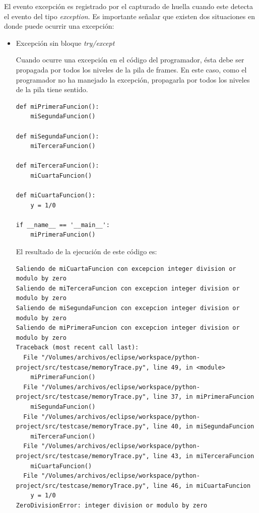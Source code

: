 \documentclass[12pt,legalpaper]{report}
\begin{document}
El evento excepción es registrado por el capturado de huella cuando este detecta el evento del tipo \textit{exception}.  Es importante señalar que existen dos situaciones en donde puede ocurrir una excepción:

\begin{itemize}
	\item Excepción sin bloque \textit{try/except}

Cuando ocurre una excepción en el código del programador, ésta debe ser propagada por todos los niveles de la pila de frames.  En este caso, como el programador no ha manejado la excepción, propagarla por todos los niveles de la pila tiene sentido.

\begin{singlespace}
\begin{lstlisting}[style=Python]
def miPrimeraFuncion():
    miSegundaFuncion()
    
def miSegundaFuncion():
    miTerceraFuncion()

def miTerceraFuncion():
    miCuartaFuncion()

def miCuartaFuncion():
    y = 1/0

if __name__ == '__main__':
    miPrimeraFuncion()
\end{lstlisting}
\end{singlespace}

El resultado de la ejecución de este código es:

\begin{singlespace}
\begin{lstlisting}[style=consola,numbers=none]
Saliendo de miCuartaFuncion con excepcion integer division or modulo by zero
Saliendo de miTerceraFuncion con excepcion integer division or modulo by zero
Saliendo de miSegundaFuncion con excepcion integer division or modulo by zero
Saliendo de miPrimeraFuncion con excepcion integer division or modulo by zero
Traceback (most recent call last):
  File "/Volumes/archivos/eclipse/workspace/python-project/src/testcase/memoryTrace.py", line 49, in <module>
    miPrimeraFuncion()
  File "/Volumes/archivos/eclipse/workspace/python-project/src/testcase/memoryTrace.py", line 37, in miPrimeraFuncion
    miSegundaFuncion()
  File "/Volumes/archivos/eclipse/workspace/python-project/src/testcase/memoryTrace.py", line 40, in miSegundaFuncion
    miTerceraFuncion()
  File "/Volumes/archivos/eclipse/workspace/python-project/src/testcase/memoryTrace.py", line 43, in miTerceraFuncion
    miCuartaFuncion()
  File "/Volumes/archivos/eclipse/workspace/python-project/src/testcase/memoryTrace.py", line 46, in miCuartaFuncion
    y = 1/0
ZeroDivisionError: integer division or modulo by zero
\end{lstlisting}
\end{singlespace}	



\end{itemize}
\end{document}

